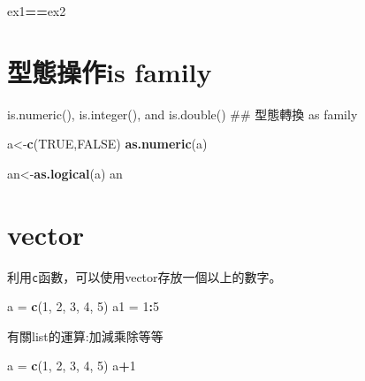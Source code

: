 \documentclass[]{book}
\newenvironment{Shaded}{\begin{snugshade}}{\end{snugshade}}
\newcommand{\KeywordTok}[1]{\textcolor[rgb]{0.13,0.29,0.53}{\textbf{#1}}}
\newcommand{\DecValTok}[1]{\textcolor[rgb]{0.00,0.00,0.81}{#1}}
\newcommand{\StringTok}[1]{\textcolor[rgb]{0.31,0.60,0.02}{#1}}
\newcommand{\OtherTok}[1]{\textcolor[rgb]{0.56,0.35,0.01}{#1}}
\newcommand{\OperatorTok}[1]{\textcolor[rgb]{0.81,0.36,0.00}{\textbf{#1}}}
\newcommand{\NormalTok}[1]{#1}
\theoremstyle{definition}
\theoremstyle{definition}
\theoremstyle{definition}
\theoremstyle{remark}
\begin{document}
\begin{Shaded}
\begin{Highlighting}[]
\NormalTok{ex1}\OperatorTok{==}\NormalTok{ex2}
\end{Highlighting}
\end{Shaded}

\section{型態操作is family}\label{is-family}

is.numeric(), is.integer(), and is.double() \#\# 型態轉換 as family

\begin{Shaded}
\begin{Highlighting}[]
\NormalTok{a<-}\KeywordTok{c}\NormalTok{(}\OtherTok{TRUE}\NormalTok{,}\OtherTok{FALSE}\NormalTok{)}
\KeywordTok{as.numeric}\NormalTok{(a)}
\end{Highlighting}
\end{Shaded}

\begin{Shaded}
\begin{Highlighting}[]
\NormalTok{an<-}\KeywordTok{as.logical}\NormalTok{(a)}
\NormalTok{an}
\end{Highlighting}
\end{Shaded}

\section{vector}\label{vector}

利用\texttt{c}函數，可以使用vector存放一個以上的數字。

\begin{Shaded}
\begin{Highlighting}[]
\NormalTok{a =}\StringTok{ }\KeywordTok{c}\NormalTok{(}\DecValTok{1}\NormalTok{, }\DecValTok{2}\NormalTok{, }\DecValTok{3}\NormalTok{, }\DecValTok{4}\NormalTok{, }\DecValTok{5}\NormalTok{)}
\NormalTok{a1 =}\StringTok{ }\DecValTok{1}\OperatorTok{:}\DecValTok{5}
\end{Highlighting}
\end{Shaded}

有關list的運算:加減乘除等等

\begin{Shaded}
\begin{Highlighting}[]
\NormalTok{a =}\StringTok{ }\KeywordTok{c}\NormalTok{(}\DecValTok{1}\NormalTok{, }\DecValTok{2}\NormalTok{, }\DecValTok{3}\NormalTok{, }\DecValTok{4}\NormalTok{, }\DecValTok{5}\NormalTok{)}
\NormalTok{a}\OperatorTok{+}\DecValTok{1}
\end{Highlighting}
\end{Shaded}
\end{document}
